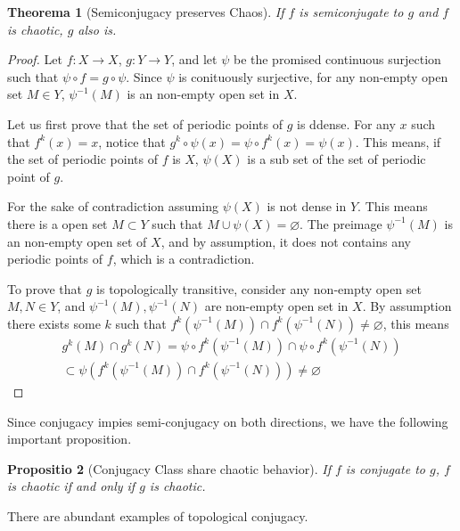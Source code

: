 \documentclass{report}
\newtheorem{thm}{Theorema}[chapter]
\newtheorem{prop}[thm]{Propositio}
\theoremstyle{definition}
\theoremstyle{definition}
\theoremstyle{remark}
\renewcommand\emptyset{\varnothing}
\begin{document}
\begin{thm}[Semiconjugacy preserves Chaos]\label{th_semicong_chaos}
	If $f$ is semiconjugate to $g$ and $f$ is chaotic, $g$ also is.
\end{thm}

\begin{proof}
	Let $f: X \rightarrow X$, $g:  Y \rightarrow Y$, and let $\psi$ be the promised continuous surjection such that
	$\psi \circ f = g \circ \psi$. 
	Since $\psi$ is conituously surjective, for any non-empty open set $M \in Y$, $\psi^{-1}(M)$ is an non-empty open set in $X$.

	Let us first prove that the set of periodic points of $g$ is ddense.
	For any $x$ such that $f^k(x) = x$, notice that $g^k \circ \psi (x) = \psi \circ f^k (x) = \psi(x)$. 
	This means, if the set of periodic points of $f$ is $X$, $\psi(X)$ is a sub set of the set of periodic point of $g$.

	For the sake of contradiction assuming $\psi(X)$ is not dense in $Y$. 
	This means there is a open set $M \subset Y$ such that $M \cup \psi(X) = \emptyset$.
	The preimage $\psi^{-1}(M)$ is an non-empty open set of $X$, and by assumption, it does not contains any periodic points of $f$, which is a contradiction.

	To prove that $g$ is topologically transitive, consider any non-empty open set $M, N \in Y$, and $\psi^{-1}(M), \psi^{-1}(N)$ are non-empty open set in $X$. 
	By assumption there exists some $k$ such that $f^k(\psi^{-1}(M)) \cap f^k(\psi^{-1}(N)) \neq \emptyset$, this means 
	\begin{align*}
		g^k(M) \cap g^k(N) = \psi \circ f^k(\psi^{-1}(M)) \cap \psi \circ f^k(\psi^{-1}(N)) \\
		\subset \psi( f^k(\psi^{-1}(M)) \cap  f^k(\psi^{-1}(N))) \neq \emptyset
	\end{align*}
\end{proof}

Since conjugacy impies semi-conjugacy on both directions, we have the following important proposition.

\begin{prop}[Conjugacy Class share chaotic behavior]\label{prop_conj_chaos}
	If $f$ is conjugate to $g$, $f$ is chaotic if and only if $g$ is chaotic.
\end{prop}

There are abundant examples of topological conjugacy.
\end{document}
